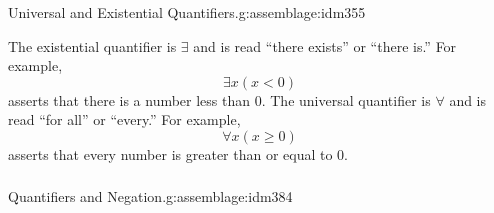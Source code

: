 \documentclass[11pt, compress]{beamer}
\begin{document}
\begin{frame}
\frametitle{}
\begin{assemblage}{Universal and Existential Quantifiers.}{g:assemblage:idm355}%

The existential quantifier is \(\exists\) and is read ``there exists'' or ``there is.'' For example, \label{g:notation:idm366}%
\begin{equation*}
\exists x (x \lt 0)
\end{equation*}
asserts that there is a number less than 0.
The universal quantifier is \(\forall\) and is read ``for all'' or ``every.'' For example, \label{g:notation:idm379}%
\begin{equation*}
\forall x (x \ge 0)
\end{equation*}
asserts that every number is greater than or equal to 0.\end{assemblage}
\end{frame}
 
\begin{frame}
\frametitle{}
\begin{assemblage}{Quantifiers and Negation.}{g:assemblage:idm384}%
\end{assemblage}
\end{frame}
 
\end{document}
